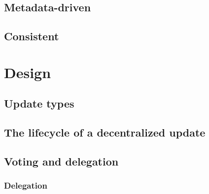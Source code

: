 \documentclass[11pt,a4paper]{article}
\begin{document}
\subsection{Metadata-driven}
\label{sec:metadata-driven}

\subsection{Consistent}
\label{sec:cons-update-logic}


\section{Design}
\label{sec:design}


\subsection{Update types}
\label{sec:update-types}



\subsection{The lifecycle of a decentralized update}
\label{sec:phases-an-update}


\subsection{Voting and delegation}
\label{sec:voting-delegation}

\subsubsection{Delegation}
\label{sec:delegation}

\end{document}

